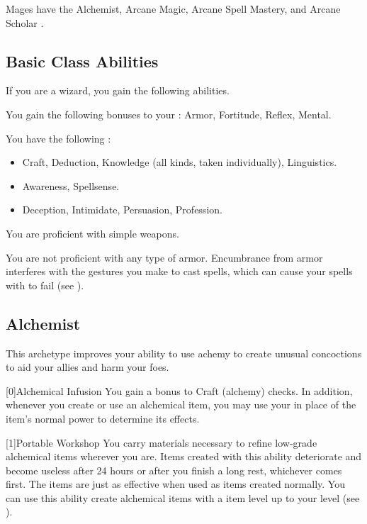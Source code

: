      Mages have the Alchemist, Arcane Magic, Arcane Spell Mastery, and Arcane Scholar .

    \subsection{Basic Class Abilities}
        If you are a wizard, you gain the following abilities.

        You gain the following bonuses to your :  Armor,  Fortitude,  Reflex,  Mental.

        You have the following :
        \begin{itemize}
            \item {} Craft, Deduction, Knowledge (all kinds, taken individually), Linguistics.
            \item {} Awareness, Spellsense.
            \item {} Deception, Intimidate, Persuasion, Profession.
        \end{itemize}

        You are proficient with simple weapons.

        You are not proficient with any type of armor.
        Encumbrance from armor interferes with the gestures you make to cast spells, which can cause your spells with  to fail (see ).

    \newpage
    \subsection{Alchemist}
        This archetype improves your ability to use achemy to create unusual concoctions to aid your allies and harm your foes.

        [0]{Alchemical Infusion} You gain a  bonus to Craft (alchemy) checks.
        In addition, whenever you create or use an alchemical item, you may use your   in place of the item's normal power to determine its effects.

        [1]{Portable Workshop} 
        You carry materials necessary to refine low-grade alchemical items wherever you are.
        Items created with this ability deteriorate and become useless after 24 hours or after you finish a long rest, whichever comes first.
        The items are just as effective when used as items created normally.
        You can use this ability create alchemical items with a item level up to your level (see ).

